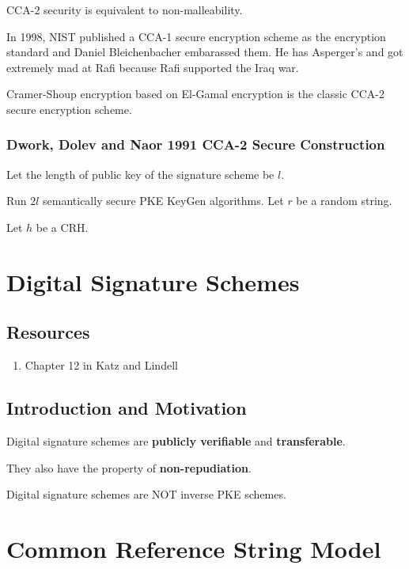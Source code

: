 \documentclass{article}
\theoremstyle{definition}
\begin{document}
CCA-2 security is equivalent to non-malleability.

In 1998, NIST published a CCA-1 secure encryption scheme as the encryption standard and  Daniel Bleichenbacher 
embarassed them. He has Asperger's and got extremely mad at Rafi because Rafi supported the Iraq war.

Cramer-Shoup encryption based on El-Gamal encryption is the classic CCA-2 secure encryption
scheme.

\subsubsection{Dwork, Dolev and Naor 1991 CCA-2 Secure Construction}

Let the length of public key of the signature scheme be $l$.

Run $2l$ semantically secure PKE KeyGen algorithms.
Let $r$ be a random string.

Let $h$ be a CRH.




\newpage

\section{Digital Signature Schemes}

\subsection{Resources}

\begin{enumerate}
    \item Chapter 12 in Katz and Lindell
\end{enumerate}

\subsection{Introduction and Motivation}

Digital signature schemes are \textbf{publicly verifiable} and \textbf{transferable}.

They also have the property of \textbf{non-repudiation}.

Digital signature schemes are NOT inverse PKE schemes.



\newpage

\section{Common Reference String Model}
\end{document}
